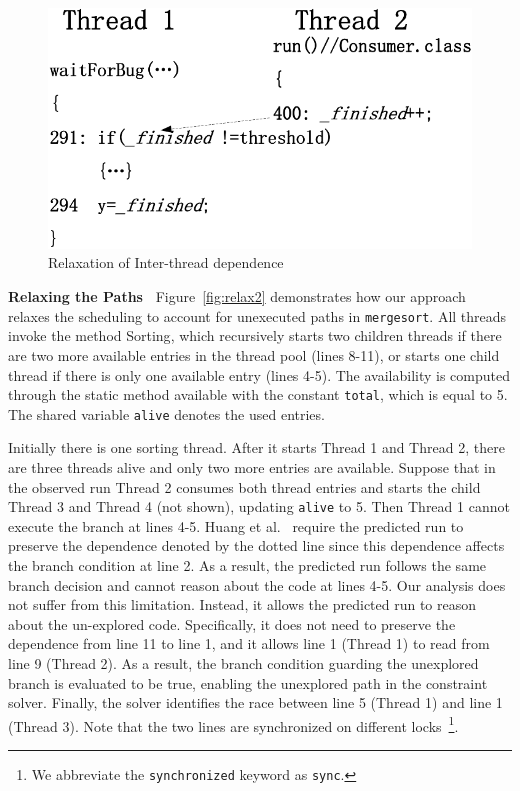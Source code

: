  

\begin{figure}[htp]
\centering
\includegraphics[scale=0.45]{figs/Visio-bbuffer.pdf}
\caption{Relaxation of Inter-thread dependence}\label{fig:relax1}
\end{figure}

{\bf Relaxing the Paths\ } Figure~\ref{fig:relax2} demonstrates how our 
approach relaxes the scheduling to account for  unexecuted paths in 
{\tt mergesort}. 
All threads invoke the method {\sf Sorting}, which recursively starts 
two children threads if there are two more available entries in the 
thread pool (lines 8-11), or starts one child thread if there is only 
one available entry (lines 4-5).  The availability is computed through 
the static method {\sf available} with the constant {\tt total}, which is equal to 5. The shared variable {\tt alive} denotes the used entries.

 
Initially there is one sorting thread. After it starts Thread 1 and 
Thread 2, there are three threads alive and only two more 
entries are available. Suppose that in the observed run Thread 2 
consumes both thread entries and starts the child Thread 3 
and Thread 4 (not shown), updating {\tt alive} to 5. Then Thread 1 
cannot execute the branch at lines 4-5. Huang et al.~\cite{pldi14} require the predicted run to preserve the dependence denoted by the dotted line since this dependence affects the branch condition at line 2. As a result, the predicted run follows the same branch decision and cannot reason about the code at lines 4-5. Our analysis does not suffer from this limitation. Instead, it allows the predicted run to reason about the un-explored code. Specifically, it does not need to preserve the dependence from line 11 to line 1, and it allows line 1 (Thread 1) to read from line 9 (Thread 2). As a result, the branch condition guarding the unexplored branch is evaluated to be true, enabling the unexplored path in the constraint solver. Finally, the solver identifies the race between line 5 (Thread 1) and line 1 (Thread 3). Note that the two lines are synchronized on different locks~\footnote{We abbreviate the {\tt synchronized} keyword as {\tt sync}.
}. 

